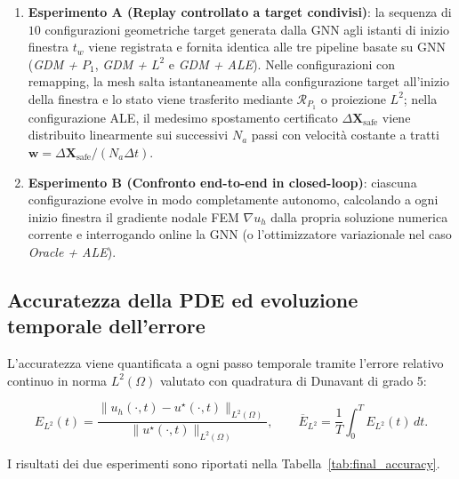 \begin{enumerate}
    \item \textbf{Esperimento A (Replay controllato a target condivisi)}: la sequenza di $10$ configurazioni geometriche target generata dalla GNN agli istanti di inizio finestra $t_w$ viene registrata e fornita identica alle tre pipeline basate su GNN (\textit{GDM + $P_1$}, \textit{GDM + $L^2$} e \textit{GDM + ALE}). Nelle configurazioni con remapping, la mesh salta istantaneamente alla configurazione target all'inizio della finestra e lo stato viene trasferito mediante $\mathcal{R}_{P_1}$ o proiezione $L^2$; nella configurazione ALE, il medesimo spostamento certificato $\Delta\mathbf{X}_{\mathrm{safe}}$ viene distribuito linearmente sui successivi $N_a$ passi con velocità costante a tratti $\mathbf{w} = \Delta\mathbf{X}_{\mathrm{safe}}/(N_a\Delta t)$.
    \item \textbf{Esperimento B (Confronto end-to-end in closed-loop)}: ciascuna configurazione evolve in modo completamente autonomo, calcolando a ogni inizio finestra il gradiente nodale FEM $\nabla u_h$ dalla propria soluzione numerica corrente e interrogando online la GNN (o l'ottimizzatore variazionale nel caso \textit{Oracle + ALE}).
\end{enumerate}

\subsection{Accuratezza della PDE ed evoluzione temporale dell'errore}

\label{subsec:error_dynamics}

L'accuratezza viene quantificata a ogni passo temporale tramite l'errore relativo continuo in norma $L^2(\Omega)$ valutato con quadratura di Dunavant di grado 5:

\begin{equation}
E_{L^2}(t)
=
\frac{
\|u_h(\cdot,t)-u^\star(\cdot,t)\|_{L^2(\Omega)}
}{
\|u^\star(\cdot,t)\|_{L^2(\Omega)}
},
\qquad
\overline{E}_{L^2}
=
\frac{1}{T}
\int_0^T
E_{L^2}(t)\,dt.
\label{eq:final_l2_metrics}
\end{equation}

I risultati dei due esperimenti sono riportati nella Tabella~\ref{tab:final_accuracy}.

